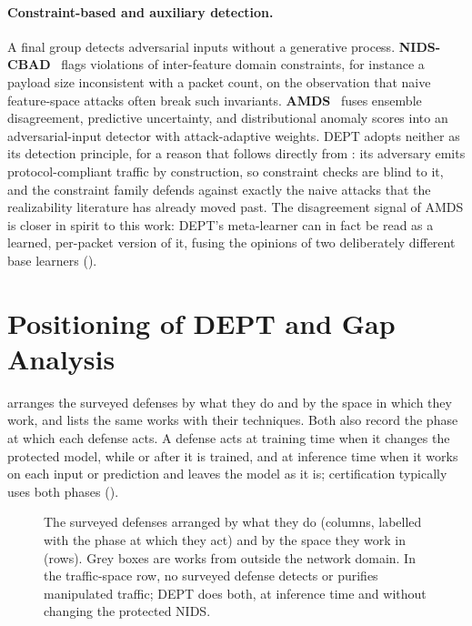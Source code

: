 \paragraph{Constraint-based and auxiliary detection.}
A final group detects adversarial inputs without a generative process.
\textbf{NIDS-CBAD}~\cite{kumar2025nids} flags violations of inter-feature domain
constraints, for instance a payload size inconsistent with a packet count, on the
observation that naive feature-space attacks often break such invariants.
\textbf{AMDS}~\cite{olukola2026amds} fuses ensemble disagreement, predictive
uncertainty, and distributional anomaly scores into an adversarial-input detector with
attack-adaptive weights. DEPT adopts neither as its detection principle, for a reason
that follows directly from : its adversary emits
protocol-compliant traffic by construction, so constraint checks are blind to it, and
the constraint family defends against exactly the naive attacks that the realizability
literature has already moved past. The disagreement signal of AMDS is closer in
spirit to this work: DEPT's meta-learner can in fact be read as a learned,
per-packet version of it, fusing the opinions of two deliberately different base
learners ().

\section{Positioning of DEPT and Gap Analysis}\label{sec:rel-positioning}
 arranges the surveyed defenses by what they do and by the space
in which they work, and  lists the same works with their
techniques. Both also record the phase at which each defense acts. A defense acts at
training time when it changes the protected model, while or after it is trained, and at
inference time when it works on each input or prediction and leaves the model as it is;
certification typically uses both phases ().

\begin{figure}[htbp]
    \centering
    
    \caption[The surveyed defenses by strategy, phase and space.]{The surveyed defenses
    arranged by what they do (columns, labelled with the phase at which they act) and by
    the space they work in (rows). Grey boxes are works from outside the network domain.
    In the traffic-space row, no surveyed defense detects or purifies manipulated traffic;
    DEPT does both, at inference time and without changing the protected NIDS.}
    \label{fig:rel-landscape}
\end{figure}

